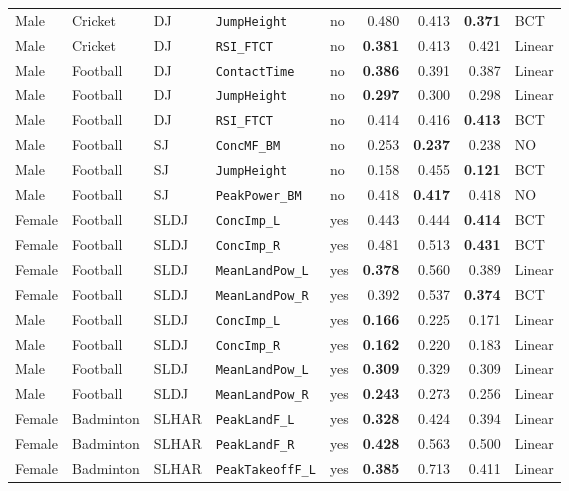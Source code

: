 {\begin{longtable}{lllllrrrl}
Male & Cricket & DJ & \texttt{JumpHeight} & no & 0.480 & 0.413 & \textbf{0.371} & BCT \\
Male & Cricket & DJ & \texttt{RSI\_FTCT} & no & \textbf{0.381} & 0.413 & 0.421 & Linear \\
Male & Football & DJ & \texttt{ContactTime} & no & \textbf{0.386} & 0.391 & 0.387 & Linear \\
Male & Football & DJ & \texttt{JumpHeight} & no & \textbf{0.297} & 0.300 & 0.298 & Linear \\
Male & Football & DJ & \texttt{RSI\_FTCT} & no & 0.414 & 0.416 & \textbf{0.413} & BCT \\
\addlinespace[1pt]
Male & Football & SJ & \texttt{ConcMF\_BM} & no & 0.253 & \textbf{0.237} & 0.238 & NO \\
Male & Football & SJ & \texttt{JumpHeight} & no & 0.158 & 0.455 & \textbf{0.121} & BCT \\
Male & Football & SJ & \texttt{PeakPower\_BM} & no & 0.418 & \textbf{0.417} & 0.418 & NO \\
\addlinespace[1pt]
Female & Football & SLDJ & \texttt{ConcImp\_L} & yes & 0.443 & 0.444 & \textbf{0.414} & BCT \\
Female & Football & SLDJ & \texttt{ConcImp\_R} & yes & 0.481 & 0.513 & \textbf{0.431} & BCT \\
Female & Football & SLDJ & \texttt{MeanLandPow\_L} & yes & \textbf{0.378} & 0.560 & 0.389 & Linear \\
Female & Football & SLDJ & \texttt{MeanLandPow\_R} & yes & 0.392 & 0.537 & \textbf{0.374} & BCT \\
Male & Football & SLDJ & \texttt{ConcImp\_L} & yes & \textbf{0.166} & 0.225 & 0.171 & Linear \\
Male & Football & SLDJ & \texttt{ConcImp\_R} & yes & \textbf{0.162} & 0.220 & 0.183 & Linear \\
Male & Football & SLDJ & \texttt{MeanLandPow\_L} & yes & \textbf{0.309} & 0.329 & 0.309 & Linear \\
Male & Football & SLDJ & \texttt{MeanLandPow\_R} & yes & \textbf{0.243} & 0.273 & 0.256 & Linear \\
\addlinespace[1pt]
Female & Badminton & SLHAR & \texttt{PeakLandF\_L} & yes & \textbf{0.328} & 0.424 & 0.394 & Linear \\
Female & Badminton & SLHAR & \texttt{PeakLandF\_R} & yes & \textbf{0.428} & 0.563 & 0.500 & Linear \\
Female & Badminton & SLHAR & \texttt{PeakTakeoffF\_L} & yes & \textbf{0.385} & 0.713 & 0.411 & Linear \\

\end{longtable}}
